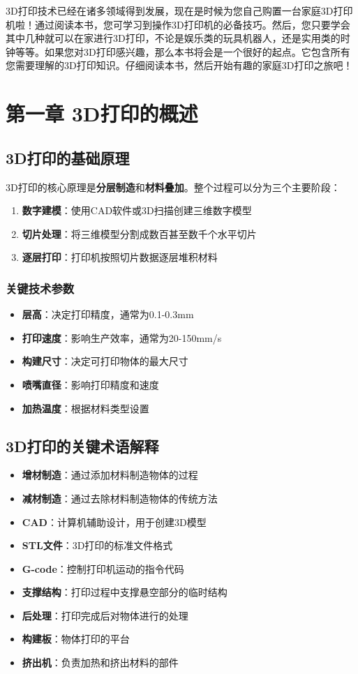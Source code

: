 \documentclass[12pt,UTF8]{ctexbook}
\begin{document}
3D打印技术已经在诸多领域得到发展，现在是时候为您自己购置一台家庭3D打印机啦！通过阅读本书，您可学习到操作3D打印机的必备技巧。然后，您只要学会其中几种就可以在家进行3D打印，不论是娱乐类的玩具机器人，还是实用类的时钟等等。如果您对3D打印感兴趣，那么本书将会是一个很好的起点。它包含所有您需要理解的3D打印知识。仔细阅读本书，然后开始有趣的家庭3D打印之旅吧！

\chapter{第一章 3D打印的概述}

\section{3D打印的基础原理}
3D打印的核心原理是\textbf{分层制造}和\textbf{材料叠加}。整个过程可以分为三个主要阶段：

\begin{enumerate}
\item \textbf{数字建模}：使用CAD软件或3D扫描创建三维数字模型
\item \textbf{切片处理}：将三维模型分割成数百甚至数千个水平切片
\item \textbf{逐层打印}：打印机按照切片数据逐层堆积材料
\end{enumerate}

\subsection{关键技术参数}
\begin{itemize}
\item \textbf{层高}：决定打印精度，通常为0.1-0.3mm
\item \textbf{打印速度}：影响生产效率，通常为20-150mm/s
\item \textbf{构建尺寸}：决定可打印物体的最大尺寸
\item \textbf{喷嘴直径}：影响打印精度和速度
\item \textbf{加热温度}：根据材料类型设置
\end{itemize}

\section{3D打印的关键术语解释}
\begin{itemize}
\item \textbf{增材制造}：通过添加材料制造物体的过程
\item \textbf{减材制造}：通过去除材料制造物体的传统方法
\item \textbf{CAD}：计算机辅助设计，用于创建3D模型
\item \textbf{STL文件}：3D打印的标准文件格式
\item \textbf{G-code}：控制打印机运动的指令代码
\item \textbf{支撑结构}：打印过程中支撑悬空部分的临时结构
\item \textbf{后处理}：打印完成后对物体进行的处理
\item \textbf{构建板}：物体打印的平台
\item \textbf{挤出机}：负责加热和挤出材料的部件
\end{itemize}
\end{document}
